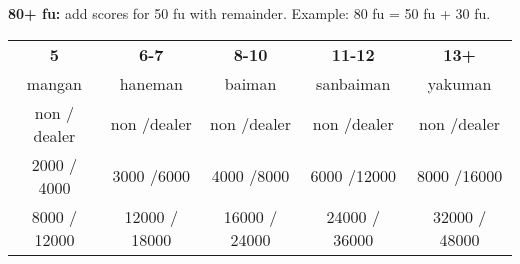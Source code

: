\documentclass{article}
\newcommand\scorepair[2]{\hfill{}#1 $/$\hfill{}#2}
\begin{document}
\textbf{80+ fu:} add scores for 50 fu with remainder. Example: 80 fu = 50 fu + 30 fu.

\begin{tabular}{|c|c|c|c|c|}
  \hline
  \textbf{5} & \textbf{6-7} & \textbf{8-10} & \textbf{11-12} & \textbf{13+}\\
  mangan & haneman & baiman & sanbaiman & yakuman\\
  \hdashline
  \scorepair{non}{dealer} & \scorepair{non}{dealer} & \scorepair{non}{dealer} & \scorepair{non}{dealer} & \scorepair{non}{dealer}\\
  \hline\hline
  \scorepair{2000}{ 4000} & \scorepair{3000}{6000} & \scorepair{4000}{8000} & \scorepair{6000}{12000} & \scorepair{8000}{16000}\\
  \scorepair{8000}{12000} & \scorepair{12000}{18000} & \scorepair{16000}{24000} & \scorepair{24000}{ 36000} & \scorepair{32000}{ 48000}\\
  \hline
\end{tabular}
\end{document}
